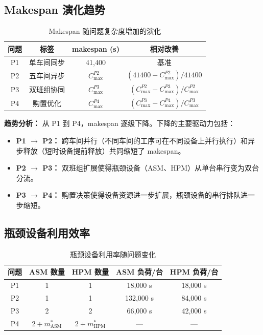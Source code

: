 \documentclass[UTF8,a4paper,12pt]{ctexart}
\begin{document}
\subsection{Makespan 演化趋势}
\begin{table}[htbp]
  \centering
  \caption{Makespan 随问题复杂度增加的演化}
  \label{tab:makespan_trend}
  \begin{tabular}{cccc}
    \toprule
    问题 & 标签 & makespan (s) & 相对改善 \\
    \midrule
    P1 & 单车间同步 & 41,400 & 基准 \\
    P2 & 五车间异步 & $C_{\max}^{P2}$ & $(41400 - C_{\max}^{P2}) / 41400$ \\
    P3 & 双班组协同 & $C_{\max}^{P3}$ & $(C_{\max}^{P2} - C_{\max}^{P3}) / C_{\max}^{P2}$ \\
    P4 & 购置优化 & $C_{\max}^{P4}$ & $(C_{\max}^{P3} - C_{\max}^{P4}) / C_{\max}^{P3}$ \\
    \bottomrule
  \end{tabular}
\end{table}

\textbf{趋势分析：} 从 P1 到 P4，makespan 逐级下降。下降的主要驱动力包括：
\begin{itemize}
  \item \textbf{P1 $\to$ P2：} 跨车间并行（不同车间的工序可在不同设备上并行执行）和异步释放（短时设备提前释放）共同缩短了 makespan。
  \item \textbf{P2 $\to$ P3：} 双班组扩展使得瓶颈设备（ASM、HPM）从单台串行变为双台分流。
  \item \textbf{P3 $\to$ P4：} 购置决策使得设备资源进一步扩展，瓶颈设备的串行排队进一步缩短。
\end{itemize}

\subsection{瓶颈设备利用效率}
\begin{table}[htbp]
  \centering
  \caption{瓶颈设备利用率随问题变化}
  \label{tab:bottleneck_efficiency}
  \begin{tabular}{ccccc}
    \toprule
    问题 & ASM 数量 & HPM 数量 & ASM 负荷/台 & HPM 负荷/台 \\
    \midrule
    P1 & 1 & 1 & 18,000 s & 18,000 s \\
    P2 & 1 & 1 & 132,000 s & 84,000 s \\
    P3 & 2 & 2 & 66,000 s & 42,000 s \\
    P4 & $2+m_{\text{ASM}}^*$ & $2+m_{\text{HPM}}^*$ & — & — \\
    \bottomrule
  \end{tabular}
\end{table}
\end{document}
